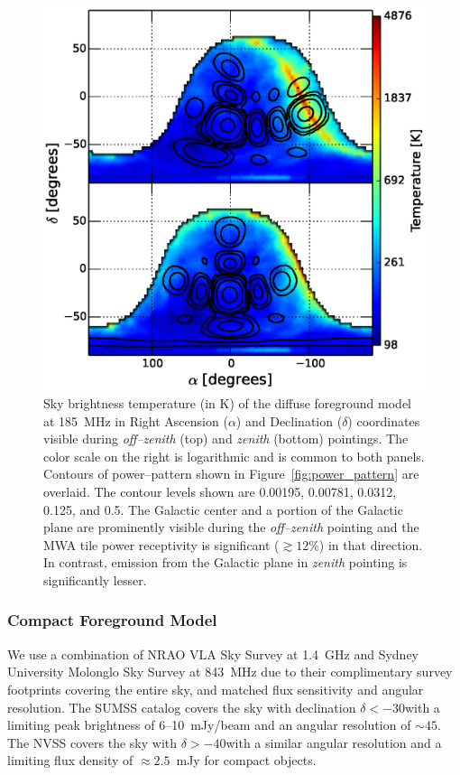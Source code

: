 \documentclass[preprint2,iop,numberedappendix]{emulateapj}
\begin{document}
\begin{figure}[htb]
\centering
\includegraphics[width=\linewidth]{figures/v1_0/dsm.eps}
\caption{Sky brightness temperature (in K) of the diffuse foreground model at 185~MHz in Right Ascension ($\alpha$) and Declination ($\delta$) coordinates visible during {\it off--zenith} (top) and {\it zenith} (bottom) pointings. The color scale on the right is logarithmic and is common to both panels. Contours of power--pattern shown in Figure~\ref{fig:power_pattern} are overlaid. The contour levels shown are 0.00195, 0.00781, 0.0312, 0.125, and 0.5. The Galactic center and a portion of the Galactic plane are prominently visible during the {\it off--zenith} pointing and the MWA tile power receptivity is significant ($\gtrsim 12$\%) in that direction. In contrast, emission from the Galactic plane in {\it zenith} pointing is significantly lesser. \label{fig:DSM}}
\end{figure}

\subsubsection{Compact Foreground Model}\label{sec:CSM}

We use a combination of NRAO VLA Sky Survey \citep[NVSS;][]{con98} at 1.4~GHz and Sydney University Molonglo Sky Survey \citep[SUMSS;][]{boc99,mau03} at 843~MHz due to their complimentary survey footprints covering the entire sky, and matched flux sensitivity and angular resolution. The SUMSS catalog covers the sky with declination $\delta < -30$\arcdeg with a limiting peak brightness of 6--10~mJy/beam and an angular resolution of $\sim 45$\arcsec. The NVSS covers the sky with $\delta > -40$\arcdeg with a similar angular resolution and a limiting flux density of $\approx 2.5$~mJy for compact objects. 
\end{document}
